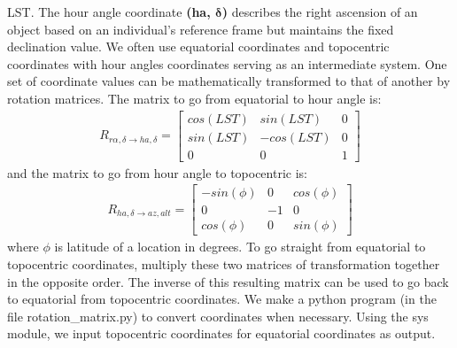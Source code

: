 \documentclass{article}
\begin{document}
LST. The hour angle coordinate \textbf{(ha, $\boldsymbol\delta$)} 
describes the right ascension of an object based on an individual's
reference frame but maintains the fixed declination value. We often use
equatorial coordinates and topocentric coordinates with hour angles
coordinates serving as an intermediate system. One set of coordinate
values can be mathematically transformed to that of another by rotation
matrices. The matrix to go from equatorial to hour angle is:
\begin{align}R_{{r\alpha, \delta}\rightarrow{ha, \delta}}
  = \begin{bmatrix}cos(LST) & sin(LST) & 0\\sin(LST) & -cos(LST) & 0\\0
    & 0 & 1\end{bmatrix}
\end{align}
and the matrix to go from hour angle to topocentric is:
\begin{align}R_{{ha, \delta}\rightarrow{az, alt}}
  = \begin{bmatrix}-sin(\phi) & 0 & cos(\phi)\\0 & -1 & 0\\cos(\phi) & 0
    & sin(\phi)\end{bmatrix}
\end{align}
where $\phi$ is latitude of a location in degrees. To go straight from
equatorial to topocentric coordinates, multiply these two matrices of
transformation together in the opposite order. The inverse of this
resulting matrix can be used to go back to equatorial from topocentric
coordinates. We make a python program (in the file rotation\_matrix.py)
to convert coordinates when necessary. Using the sys module, we input
topocentric coordinates for equatorial coordinates as output.
\end{document}
